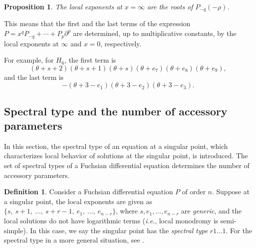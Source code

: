 \documentclass[a4paper,12pt]{article}
\newtheorem{prp}[thm]{Proposition}
\theoremstyle{definition}
\newtheorem{dfn}[thm]{Definition}
\theoremstyle{remark}
\numberwithin{equation}{section} %
\begin{document}
\begin{prp}\label{localat1}The local exponents at $x=\infty$
  are the roots of $P_{-q}(-\rho)$.
\end{prp}
This means that the first and the last terms of the expression
$P=x^qP_{-q}+\cdots+P_p\partial^p$ are determined,
up to multiplicative constants,
by the local exponents at $\infty$ and $x=0$, respectively.

For example, for $H_6$, the first term is
$$(\theta+s+2)(\theta+s+1)(\theta+s)(\theta+e_7)(\theta+e_8)(\theta+e_9),$$
and the last term is
$$-(\theta+3-e_1)(\theta+3-e_2)(\theta+3-e_3).$$
\subsection{Spectral type and the number of accessory parameters}\label{GenLoc}
In this section, the spectral type of an equation at a singular point, which characterizes local behavior of solutions at the singular point, is introduced. The set of spectral types of a Fuchsian differential equation determines the number of accessory parameters.
\begin{dfn}Consider a Fuchsian differential equation $P$ of order $n$.
  Suppose at a singular point,  the local exponents are given
  as $\{s,\  s+1,\  \dots,\  s+r-1,\  e_1,\  \dots,\ e_{n-r}\}$, %
  where $s, e_1,\dots,e_{n-r}$ are {\it generic}, %
and the local solutions do not have logarithmic   terms ({\it i.e.}, local monodromy is semi-simple).
  In this case, we say the singular point has
  the {\it spectral type} $r1\dots1$.
For the spectral type in a more general situation, see \cite{Osh,Hara}.\end{dfn}
\end{document}
